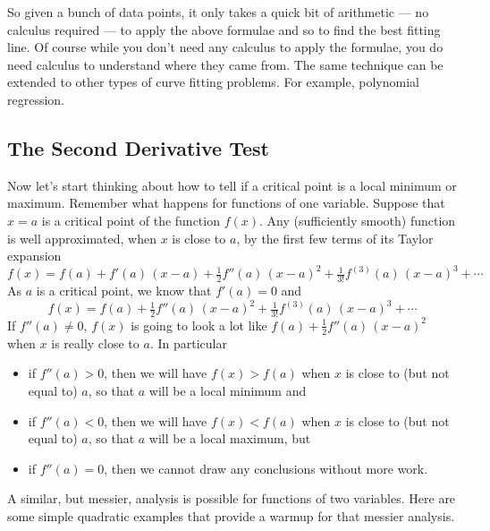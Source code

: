\begin{eg}
So given a bunch of data points, it only takes a quick bit of arithmetic ---
no calculus required --- to apply the above formulae and so to find the 
best fitting line. Of course while you don't need any calculus to apply
the formulae, you do need calculus to understand where they came from.
The same technique can be extended to other types of curve fitting problems.
For example, polynomial regression.
\end{eg}



\subsection*{The Second Derivative Test}

Now let's start thinking about how to tell if a critical point is 
a local minimum or maximum. Remember what happens for
functions of one variable. Suppose that $x=a$ is a critical point of the
function $f(x)$. Any (sufficiently smooth) function is well approximated,
when $x$ is close to $a$, by the first few terms of its Taylor expansion
\begin{equation*}
f(x) = f(a) + f'(a)\,(x-a) + \tfrac{1}{2} f''(a)\,(x-a)^2 
         +\tfrac{1}{3!} f^{(3)}(a)\, (x-a)^3 + \cdots
\end{equation*}
As $a$ is a critical point, we know that $f'(a)=0$ and 
\begin{equation*}
f(x) = f(a) + \tfrac{1}{2} f''(a)\,(x-a)^2 
         +\tfrac{1}{3!} f^{(3)}(a)\, (x-a)^3 + \cdots
\end{equation*}
If $f''(a)\ne 0$, $f(x)$ is going to look a lot like 
$f(a) + \tfrac{1}{2} f''(a)\,(x-a)^2 $ when $x$ is really close to
$a$. In particular
\begin{itemize}
\item 
if $f''(a)>0$, then we will have $f(x)>f(a)$ when $x$
is close to (but not equal to) $a$, so that $a$ will be a local minimum
and
\item 
if $f''(a)<0$, then we will have $f(x)<f(a)$ when $x$
is close to (but not equal to) $a$, so that $a$ will be a local maximum,
but
\item 
if $f''(a)=0$, then we cannot draw any conclusions without more work.
\end{itemize}
A similar, but messier, analysis is possible for functions of
two variables. Here are some simple quadratic examples that provide 
a warmup for that messier analysis.

